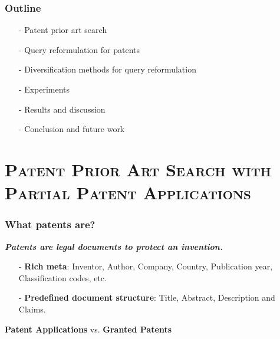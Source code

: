 \documentclass[xcolor=x11names,compress]{beamer}
\renewcommand{\(}{\begin{columns}}
\renewcommand{\)}{\end{columns}}
\newcommand{\<}[1]{\begin{column}{#1}}
\renewcommand{\>}{\end{column}}
\begin{document}


\begin{frame}
\frametitle{Outline}
\begin{itemize}
\item[-] Patent prior art search
\item[-] Query reformulation for patents
\item[-] Diversification methods for query reformulation
\item[-] Experiments 
\item[-] Results and discussion
\item[-] Conclusion and future work
\end{itemize}
\end{frame}

\section{\scshape Patent Prior Art Search with Partial Patent Applications}

\begin{frame}
\frametitle{What patents are?}

\textit{\textbf{{\color{DeepSkyBlue4}Patents are legal documents to protect an invention.}}}

\begin{itemize}
\item[-] \textbf{Rich meta}: Inventor, Author, Company, Country, Publication year, Classification codes, etc.
\item[-] \textbf{Predefined document structure}: Title, Abstract, Description and Claims.		
\item[]
\end{itemize}

\begin{center}
\textbf{Patent Applications} vs. \textbf{Granted Patents}
\end{center}

\end{frame}
\end{document}
